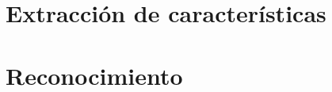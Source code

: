 


\section{Extracci\'on de caracter\'isticas}\label{secc:pruebasFisicas}


%


\section{Reconocimiento}\label{secc:disenoMetodoFatiga}



